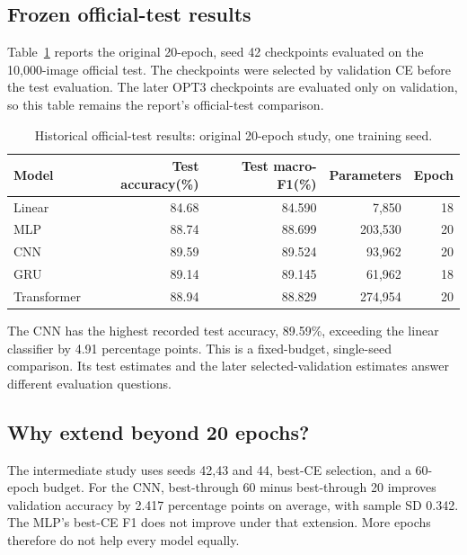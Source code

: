 \subsection{Frozen official-test results}
Table\ \ref{tab:test} reports the original 20-epoch, seed 42 checkpoints evaluated on the 10,000-image official test. The checkpoints were selected by validation CE before the test evaluation. The later OPT3 checkpoints are evaluated only on validation, so this table remains the report's official-test comparison.
\begin{table}[H]\centering
\caption{Historical official-test results: original 20-epoch study, one training seed.}\label{tab:test}

\begin{center}
\small
\begin{tabular}{lrrrr}
\toprule
Model & Test accuracy(\%) & Test macro-F1(\%) & Parameters & Epoch \\
\midrule
Linear & 84.68 & 84.590 & 7,850 & 18 \\
MLP & 88.74 & 88.699 & 203,530 & 20 \\
CNN & 89.59 & 89.524 & 93,962 & 20 \\
GRU & 89.14 & 89.145 & 61,962 & 18 \\
Transformer & 88.94 & 88.829 & 274,954 & 20 \\
\bottomrule
\end{tabular}
\end{center}
\end{table}
The CNN has the highest recorded test accuracy, 89.59\%, exceeding the linear classifier by 4.91 percentage points. This is a fixed-budget, single-seed comparison. Its test estimates and the later selected-validation estimates answer different evaluation questions.

\subsection{Why extend beyond 20 epochs?}
The intermediate study uses seeds 42,43 and 44, best-CE selection, and a 60-epoch budget. For the CNN, best-through 60 minus best-through 20 improves validation accuracy by 2.417 percentage points on average, with sample SD 0.342. The MLP's best-CE F1 does not improve under that extension. More epochs therefore do not help every model equally.

